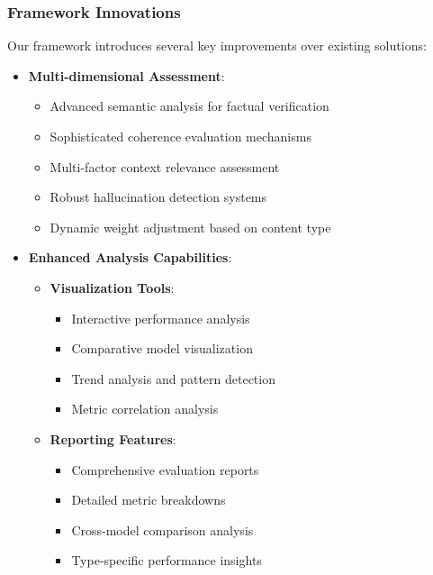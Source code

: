 \subsubsection{Framework Innovations}
Our framework introduces several key improvements over existing solutions:

\begin{itemize}
    \item \textbf{Multi-dimensional Assessment}:
    \begin{itemize}
        \item Advanced semantic analysis for factual verification
        \item Sophisticated coherence evaluation mechanisms
        \item Multi-factor context relevance assessment
        \item Robust hallucination detection systems
        \item Dynamic weight adjustment based on content type
    \end{itemize}
    
    \item \textbf{Enhanced Analysis Capabilities}:
    \begin{itemize}
        \item \textbf{Visualization Tools}:
        \begin{itemize}
            \item Interactive performance analysis
            \item Comparative model visualization
            \item Trend analysis and pattern detection
            \item Metric correlation analysis
        \end{itemize}
        \item \textbf{Reporting Features}:
        \begin{itemize}
            \item Comprehensive evaluation reports
            \item Detailed metric breakdowns
            \item Cross-model comparison analysis
            \item Type-specific performance insights
        \end{itemize}
    \end{itemize}
    

\end{itemize}
